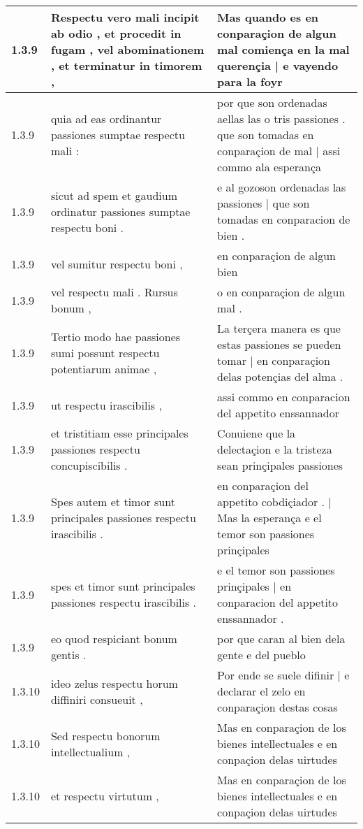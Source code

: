 \begin{tabular}{|p{1cm}|p{6.5cm}|p{6.5cm}|}
1.3.9 & Respectu vero mali incipit ab odio , et procedit in fugam , vel abominationem , et terminatur in timorem , & Mas quando es en conparaçion de algun mal comiença en la mal querençia | e vayendo para la foyr \\\hline
1.3.9 & quia ad eas ordinantur passiones sumptae respectu mali : & por que son ordenadas aellas las o tris passiones . que son tomadas en conparaçion de mal | assi commo ala esperança \\\hline
1.3.9 & sicut ad spem et gaudium ordinatur passiones sumptae respectu boni . & e al gozoson ordenadas las passiones | que son tomadas en conparacion de bien . \\\hline
1.3.9 & vel sumitur respectu boni , & en conparaçion de algun bien \\\hline
1.3.9 & vel respectu mali . Rursus bonum , & o en conparaçion de algun mal . \\\hline
1.3.9 & Tertio modo hae passiones sumi possunt respectu potentiarum animae , & La terçera manera es que estas passiones se pueden tomar | en conparaçion delas potençias del alma . \\\hline
1.3.9 & ut respectu irascibilis , & assi commo en conparacion del appetito enssannador \\\hline
1.3.9 & et tristitiam esse principales passiones respectu concupiscibilis . & Conuiene que la delectaçion e la tristeza sean prinçipales passiones \\\hline
1.3.9 & Spes autem et timor sunt principales passiones respectu irascibilis . & en conparaçion del appetito cobdiçiador . | Mas la esperança e el temor son passiones prinçipales \\\hline
1.3.9 & spes et timor sunt principales passiones respectu irascibilis . & e el temor son passiones prinçipales | en conparacion del appetito enssannador . \\\hline
1.3.9 & eo quod respiciant bonum gentis . & por que caran al bien dela gente e del pueblo \\\hline
1.3.10 & ideo zelus respectu horum diffiniri consueuit , & Por ende se suele difinir | e declarar el zelo en conparaçion destas cosas \\\hline
1.3.10 & Sed respectu bonorum intellectualium , & Mas en conparaçion de los bienes intellectuales e en conpaçion delas uirtudes \\\hline
1.3.10 & et respectu virtutum , & Mas en conparaçion de los bienes intellectuales e en conpaçion delas uirtudes \\\hline

\end{tabular}
